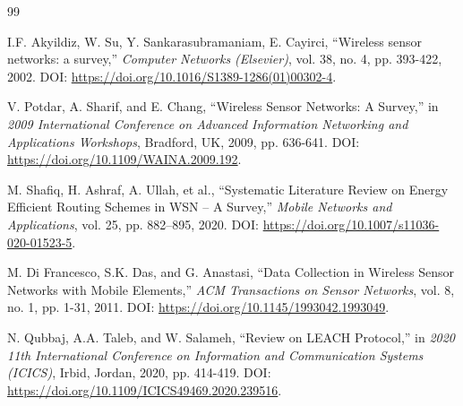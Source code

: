 \renewcommand{\bibname}{References} %

\begin{thebibliography}{99} %

I.F. Akyildiz, W. Su, Y. Sankarasubramaniam, E. Cayirci, “Wireless sensor networks: a survey,” \emph{Computer Networks (Elsevier)}, vol. 38, no. 4, pp. 393-422, 2002. DOI: \url{https://doi.org/10.1016/S1389-1286(01)00302-4}.

V. Potdar, A. Sharif, and E. Chang, “Wireless Sensor Networks: A Survey,” in \emph{2009 International Conference on Advanced Information Networking and Applications Workshops}, Bradford, UK, 2009, pp. 636-641. DOI: \url{https://doi.org/10.1109/WAINA.2009.192}.

M. Shafiq, H. Ashraf, A. Ullah, et al., “Systematic Literature Review on Energy Efficient Routing Schemes in WSN – A Survey,” \emph{Mobile Networks and Applications}, vol. 25, pp. 882–895, 2020. DOI: \url{https://doi.org/10.1007/s11036-020-01523-5}.

M. Di Francesco, S.K. Das, and G. Anastasi, “Data Collection in Wireless Sensor Networks with Mobile Elements,” \emph{ACM Transactions on Sensor Networks}, vol. 8, no. 1, pp. 1-31, 2011. DOI: \url{https://doi.org/10.1145/1993042.1993049}.

N. Qubbaj, A.A. Taleb, and W. Salameh, “Review on LEACH Protocol,” in \emph{2020 11th International Conference on Information and Communication Systems (ICICS)}, Irbid, Jordan, 2020, pp. 414-419. DOI: \url{https://doi.org/10.1109/ICICS49469.2020.239516}.

\end{thebibliography}
